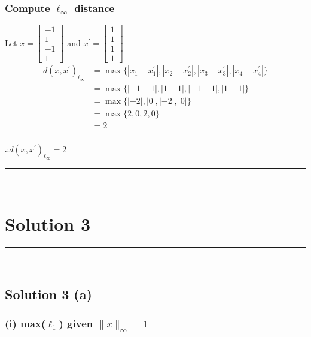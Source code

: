 \documentclass{article}
\begin{document}
\subsubsection*{Compute $\ell_{\infty}$ distance}
\parbox{\textwidth}{
Let $x = \begin{bmatrix} -1 \\ 1 \\ -1 \\ 1 \end{bmatrix}$ and $x^{\prime}=\begin{bmatrix} 1 \\ 1 \\ 1 \\ 1 \end{bmatrix}$
\begin{align*}
    d(x, x^{\prime})_{\ell_\infty} &= \max\{|x_1 - x_1^{\prime}|, |x_2 - x_2^{\prime}|, |x_3 - x_3^{\prime}|, |x_4 - x_4^{\prime}|\} \\
    &= \max\{|-1 - 1|, |1 - 1|, |-1 - 1|, |1 - 1|\} \\
    &= \max\{|-2|, |0|, |-2|, |0|\} \\
    &= \max\{2, 0, 2, 0\} \\
    &= 2
\end{align*}
}
\subsubsection*{\normalfont}{$\therefore d(x, x^{\prime})_{\ell_\infty} = 2$}

\noindent\rule{\textwidth}{0.4pt}\\

\newpage

\section*{Solution 3}
\noindent\rule{\textwidth}{0.4pt}\\
\subsection*{Solution 3 (a)}
\subsubsection*{(i) max($\ell_1$) given $\|x\|_{\infty}=1$}
\end{document}
